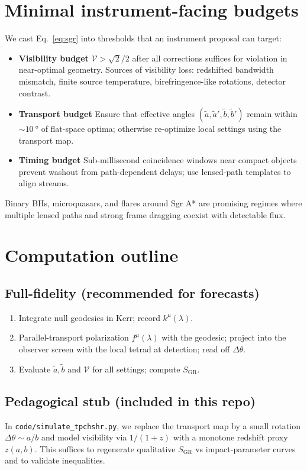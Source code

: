 \documentclass[11pt]{article}
\begin{document}
\section{Minimal instrument-facing budgets}
We cast Eq.~\eqref{eq:sgr} into thresholds that an instrument proposal can target:
\begin{itemize}
  \item \textbf{Visibility budget} \(\mathcal{V}>\sqrt{2}/2\) after all corrections suffices for violation in near-optimal geometry. Sources of visibility loss: redshifted bandwidth mismatch, finite source temperature, birefringence-like rotations, detector contrast.
  \item \textbf{Transport budget} Ensure that effective angles \((\tilde a,\tilde a',\tilde b,\tilde b')\) remain within \(\sim\SI{10}{\degree}\) of flat-space optima; otherwise re-optimize local settings using the transport map.
  \item \textbf{Timing budget} Sub-millisecond coincidence windows near compact objects prevent washout from path-dependent delays; use lensed-path templates to align streams.
\end{itemize}
Binary BHs, microquasars, and flares around Sgr A* are promising regimes where multiple lensed paths and strong frame dragging coexist with detectable flux.

\section{Computation outline}
\subsection{Full-fidelity (recommended for forecasts)}
\begin{enumerate}
  \item Integrate null geodesics in Kerr; record \(k^\mu(\lambda)\).
  \item Parallel-transport polarization \(f^\mu(\lambda)\) with the geodesic; project into the observer screen with the local tetrad at detection; read off \(\Delta\theta\).
  \item Evaluate \(\tilde a, \tilde b\) and \(\mathcal{V}\) for all settings; compute \(S_{\mathrm{GR}}\).
\end{enumerate}
\subsection{Pedagogical stub (included in this repo)}
In \texttt{code/simulate\_tpchshr.py}, we replace the transport map by a small rotation \(\Delta\theta \sim a/b\) and model visibility via \(1/(1+z)\) with a monotone redshift proxy \(z(a,b)\). This suffices to regenerate qualitative \(S_{\mathrm{GR}}\) vs impact-parameter curves and to validate inequalities.
\end{document}
